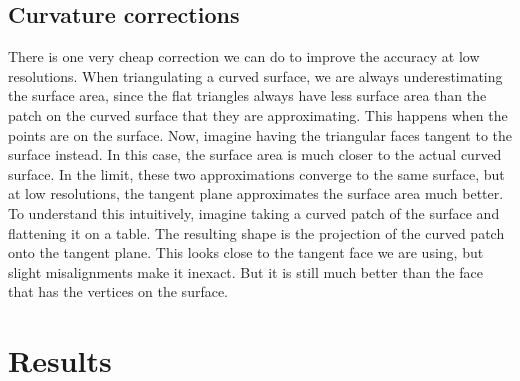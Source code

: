 \documentclass[12pt]{article}
\begin{document}
\subsection{Curvature corrections}
There is one very cheap correction we can do to improve the accuracy at low resolutions. When
triangulating a curved surface, we are always underestimating the surface area, since the flat
triangles always have less surface area than the patch on the curved surface that they are
approximating. This happens when the points are on the surface. Now, imagine having the
triangular faces tangent to the surface instead. In this case, the surface area is much closer
to the actual curved surface. In the limit, these two approximations converge to the same
surface, but at low resolutions, the tangent plane approximates the surface area much better.
To understand this intuitively, imagine taking a curved patch of the surface and flattening it
on a table. The resulting shape is the projection of the curved patch onto the tangent plane.
This looks close to the tangent face we are using, but slight misalignments make it inexact.
But it is still much better than the face that has the vertices on the surface.

\section{Results}
\end{document}
